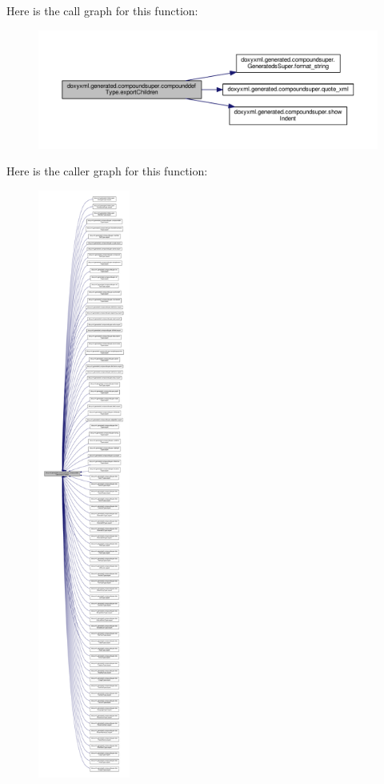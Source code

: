 Here is the call graph for this function\+:
\nopagebreak
\begin{figure}[H]
\begin{center}
\leavevmode
\includegraphics[width=350pt]{dc/d6a/classdoxyxml_1_1generated_1_1compoundsuper_1_1compounddefType_a08a27b911f897977be5d34b4d3ef37dd_cgraph}
\end{center}
\end{figure}




Here is the caller graph for this function\+:
\nopagebreak
\begin{figure}[H]
\begin{center}
\leavevmode
\includegraphics[height=550pt]{dc/d6a/classdoxyxml_1_1generated_1_1compoundsuper_1_1compounddefType_a08a27b911f897977be5d34b4d3ef37dd_icgraph}
\end{center}
\end{figure}


